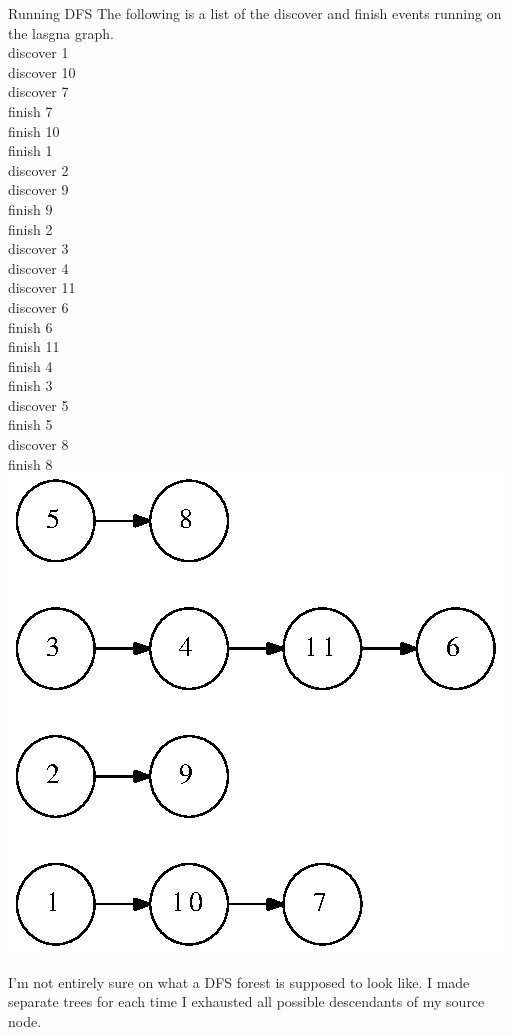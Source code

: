 \documentclass[12pt,twoside]{article}
\begin{document}
\begin{problems}
\begin{problemparts}
\problempart Running DFS
The following is a list of the discover and finish events running on the lasgna graph.\\
discover 1\\
discover 10\\
discover 7\\
finish 7\\
finish 10\\
finish 1\\
discover 2\\
discover 9\\
finish 9\\
finish 2\\
discover 3\\
discover 4\\
discover 11\\
discover 6\\
finish 6\\
finish 11\\
finish 4\\
finish 3\\
discover 5\\
finish 5\\
discover 8\\
finish 8\\

\includegraphics{forest.eps}

I'm not entirely sure on what a DFS forest is supposed to look like.  I made separate trees for each time I exhausted all possible descendants of my source node.\\


\end{problemparts}
\end{problems}
\end{document}
